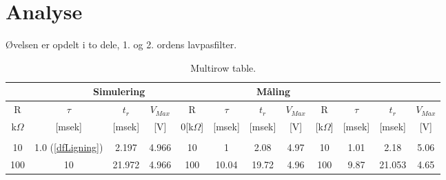 \section{Analyse}
Øvelsen er opdelt i to dele, 1. og 2. ordens lavpasfilter.




\begin{center}
\begin{table}[]
\caption{Multirow table.}
    \label{tab:table1}
    
\begin{tabular}{|c|c|c|c|c|c|c|c|c|c|c|c|}
\hline

\rowcolor[gray]{.6}
 
 \multicolumn{4}{|c|}{\textbf{Analyse}}&\multicolumn{4}{c|}{\textbf{Simulering}}&\multicolumn{4}{c|}{\textbf{Måling}}\\ \hline
 
      \multicolumn{1}{|c|}{\multirow{1}{*}{R }} & \multicolumn{1}{c|}{\multirow{1}{*}{$\tau$ }}  & \multicolumn{1}{c|}{\multirow{1}{*}{$t_{r}$ }}   & \multicolumn{1}{c|}{\multirow{1}{*}{$V_{Max}$ }}  &  \multicolumn{1}{c|}{\multirow{1}{*}{R }} & \multicolumn{1}{c|}{\multirow{1}{*}{$\tau$ }}  & \multicolumn{1}{c|}{\multirow{1}{*}{$t_{r}$ }}   & \multicolumn{1}{c|}{\multirow{1}{*}{$V_{Max}$ }}  &  \multicolumn{1}{c|}{\multirow{1}{*}{R }} & \multicolumn{1}{c|}{\multirow{1}{*}{$\tau$ }}  & \multicolumn{1}{c|}{\multirow{1}{*}{$t_{r}$ }}   & \multicolumn{1}{c|}{\multirow{1}{*}{$V_{Max}$ }}  \\ 
      
k$\Omega$  & [msek]  &  [msek] & [V]  & 0[k$\Omega$]  & [msek]   &  [msek] & [V]  & [k$\Omega$]   &  [msek]  &  [msek]  & [V]\\ \hline
\rowcolor[gray]{.8}
    \multicolumn{12}{|c|}{\textbf{ 1. ordens lavpas filter}} \\ \hline 
 

   10  & 1.0 (\ref{dfLigning})   & 2.197   & 4.966 	  &  10 &  1   & 2.08  & 4.97   &  10  &  1.01   &  2.18   & 5.06 \\ \hline 

   100&  10   & 21.972  & 4.966  &  100 & 10.04  &  19.72   & 4.96  &  100 &  9.87  &  21.053  &  4.65  \\\hline 


\end{tabular}
\end{table}
\end{center}
